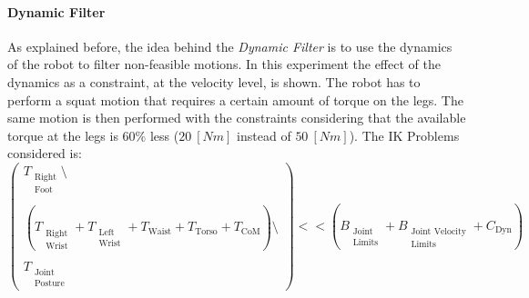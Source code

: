 \paragraph{Dynamic Filter}
As explained before, the idea behind the \emph{Dynamic Filter} is to use the dynamics of the robot to filter non-feasible motions. In this experiment the effect of the dynamics as a constraint, at the velocity level, is shown. The robot has to perform a squat motion that requires a certain amount of torque on the legs. The same motion is then performed with the constraints considering that the available torque at the legs is $60\%$  less ($20 \ [Nm]$ instead of $50 \ [Nm]$). 
The IK Problems considered is:
\begin{equation}
\begin{pmatrix}
T_{\substack{\text{Right}\\\text{Foot}}}\setminus\\
\\
\left(T_{\substack{\text{Right}\\\text{Wrist}}} + T_{\substack{\text{Left}\\\text{Wrist}}} + T_\text{Waist} + T_\text{Torso} + T_\text{CoM}\right)\setminus\\ 
\\
T_{\substack{\text{Joint}\\\text{Posture}}}
\end{pmatrix}
<< \left(B_{\substack{\text{Joint}\\\text{Limits}}} + B_{\substack{\text{Joint Velocity}\\\text{Limits}}} + C_\text{Dyn}\right)
\end{equation}

